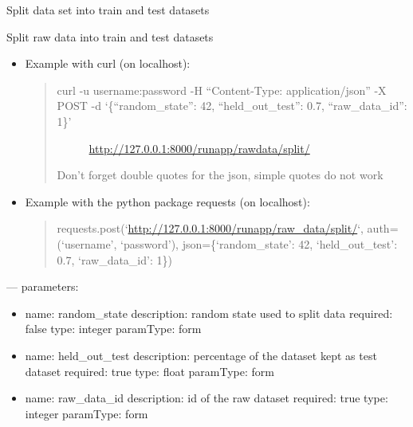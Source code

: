 \documentclass[letterpaper,10pt,english]{sphinxmanual}
\begin{document}
\begin{fulllineitems}
\label{modules/views:runapp.views.SplitTrainTest}
Split data set into train and test datasets

\begin{fulllineitems}
\label{modules/views:runapp.views.SplitTrainTest.post}
Split raw data into train and test datasets
\begin{itemize}
\item {} 
Example with curl (on localhost):
\begin{quote}
\begin{description}
\item[{curl -u username:password -H ``Content-Type: application/json''            -X POST            -d `\{``random\_state'': 42, ``held\_out\_test'': 0.7, ``raw\_data\_id'': 1\}'}] \leavevmode
\url{http://127.0.0.1:8000/runapp/rawdata/split/}

\end{description}

Don't forget double quotes for the json, simple quotes do not work
\end{quote}

\item {} 
Example with the python package requests (on localhost):
\begin{quote}

requests.post(`\url{http://127.0.0.1:8000/runapp/raw\_data/split/}`,                          auth=(`username', `password'),                          json=\{`random\_state': 42, `held\_out\_test': 0.7,                                `raw\_data\_id': 1\})
\end{quote}

\end{itemize}

---
parameters:
\begin{itemize}
\item {} 
name: random\_state
description: random state used to split data
required: false
type: integer
paramType: form

\item {} 
name: held\_out\_test
description: percentage of the dataset kept as test dataset
required: true
type: float
paramType: form

\item {} 
name: raw\_data\_id
description: id of the raw dataset
required: true
type: integer
paramType: form

\end{itemize}

\end{fulllineitems}


\end{fulllineitems}
\end{document}
